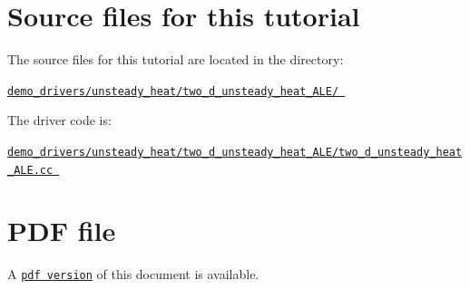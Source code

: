  

\hypertarget{index_sources}{}\section{Source files for this tutorial}\label{index_sources}

\begin{DoxyItemize}
\item The source files for this tutorial are located in the directory\+: \begin{center} \href{../../../../demo_drivers/unsteady_heat/two_d_unsteady_heat_ALE/}{\tt demo\+\_\+drivers/unsteady\+\_\+heat/two\+\_\+d\+\_\+unsteady\+\_\+heat\+\_\+\+A\+L\+E/ } \end{center} 
\item The driver code is\+: \begin{center} \href{../../../../demo_drivers/unsteady_heat/two_d_unsteady_heat_ALE/two_d_unsteady_heat_ALE.cc}{\tt demo\+\_\+drivers/unsteady\+\_\+heat/two\+\_\+d\+\_\+unsteady\+\_\+heat\+\_\+\+A\+L\+E/two\+\_\+d\+\_\+unsteady\+\_\+heat\+\_\+\+A\+L\+E.\+cc } \end{center} 
\end{DoxyItemize}



 

 \hypertarget{index_pdf}{}\section{P\+D\+F file}\label{index_pdf}
A \href{../latex/refman.pdf}{\tt pdf version} of this document is available. 
